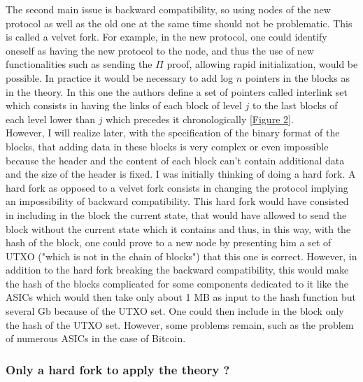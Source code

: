 \documentclass[12pt,a4paper]{article}
\newcommand{\annexe}[2]{\hyperlink{#1}{[Figure #2]}}
\begin{document}
	The second main issue is backward compatibility, so using nodes of the new protocol as well as the old one at the same time should not be problematic. This is called a velvet fork. For example, in the new protocol, one could identify oneself as having the new protocol to the node, and thus the use of new functionalities such as sending the $\Pi$ proof, allowing rapid initialization, would be possible. In practice it would be necessary to add log $n$ pointers in the blocks as in the theory. In this one the authors define a set of pointers called interlink set which consists in having the links of each block of level $j$ to the last blocks of each level lower than $j$ which precedes it chronologically \annexe{22}{2}.\\
	However, I will realize later, with the specification of the binary format of the blocks, that adding data in these blocks is very complex or even impossible because the header and the content of each block can't contain additional data and the size of the header is fixed. I was initially thinking of doing a hard fork. A hard fork as opposed to a velvet fork consists in changing the protocol implying an impossibility of backward compatibility. This hard fork would have consisted in including in the block the current state, that would have allowed to send the block without the current state which it contains and thus, in this way, with the hash of the block, one could prove to a new node by presenting him a set of UTXO ("which is not in the chain of blocks") that this one is correct. However, in addition to the hard fork breaking the backward compatibility, this would make the hash of the blocks complicated for some components dedicated to it like the ASICs which would then take only about 1 MB as input to the hash function but several Gb because of the UTXO set.
	One could then include in the block only the hash of the UTXO set. However, some problems remain, such as the problem of numerous ASICs in the case of Bitcoin. %
	
	\subsubsection{Only a hard fork to apply the theory ?}
	
\end{document}
